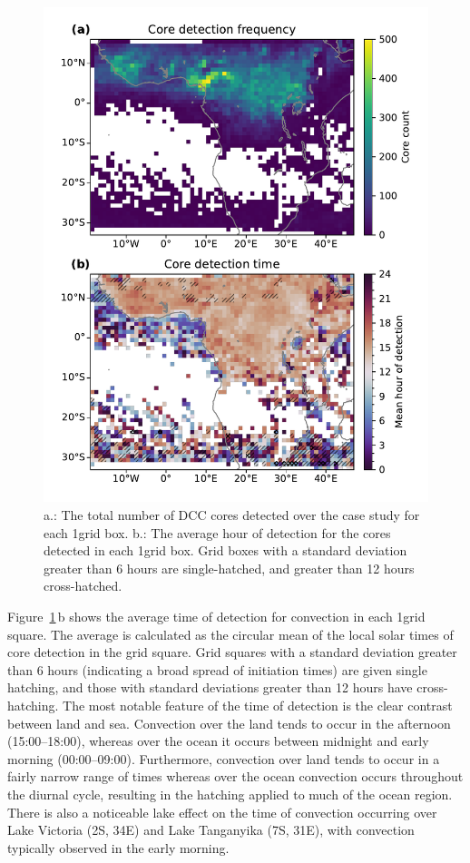 \documentclass[acp, manuscript]{copernicus}
\begin{document}
\begin{figure}[tp]
    \includegraphics[width=12cm]{figures/fig05.pdf}
    \caption[
    Number of detected cores and average hour of core detection
    ]{
    a.: The total number of DCC cores detected over the case study for each 1\textdegree grid box. b.: The average hour of detection for the cores detected in each 1\textdegree grid box. Grid boxes with a standard deviation greater than 6 hours are single-hatched, and greater than 12 hours cross-hatched.
    }
    \label{fig:seviri_map_dists}
\end{figure}


Figure~\ref{fig:seviri_map_dists}\,b shows the average time of detection for convection in each 1\textdegree grid square. 
The average is calculated as the circular mean of the local solar times of core detection in the grid square. 
Grid squares with a standard deviation greater than 6 hours (indicating a broad spread of initiation times) are given single hatching, and those with standard deviations greater than 12 hours have cross-hatching. 
The most notable feature of the time of detection is the clear contrast between land and sea. 
Convection over the land tends to occur in the afternoon (15:00--18:00), whereas over the ocean it occurs between midnight and early morning (00:00--09:00). 
Furthermore, convection over land tends to occur in a fairly narrow range of times whereas over the ocean convection occurs throughout the diurnal cycle, resulting in the hatching applied to much of the ocean region. 
There is also a noticeable lake effect on the time of convection occurring over Lake Victoria (2\textdegree S, 34\textdegree E) and Lake Tanganyika (7\textdegree S, 31\textdegree E), with convection typically observed in the early morning.
\end{document}
